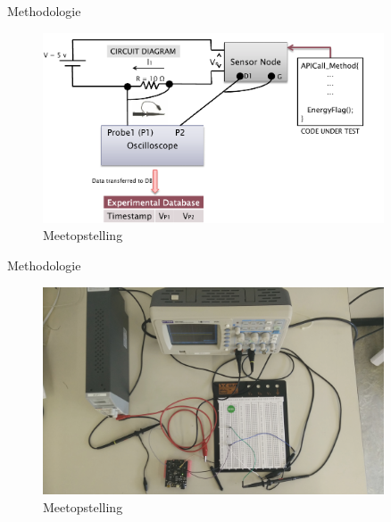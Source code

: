 \documentclass[presentation, bigger]{beamer}
\begin{document}
\begin{frame}{Methodologie}
  \begin{figure}[center]
    \centering
    \includegraphics[width=0.9\textwidth,keepaspectration=true]{elek/diag1}
    \caption{Meetopstelling}
  \end{figure}
\end{frame}

\begin{frame}{Methodologie}
  \begin{figure}[center]
    \centering
    \includegraphics[width=0.9\textwidth,keepaspectration=true]{meetopstelling}
    \caption{Meetopstelling}
  \end{figure}
\end{frame}
\end{document}
